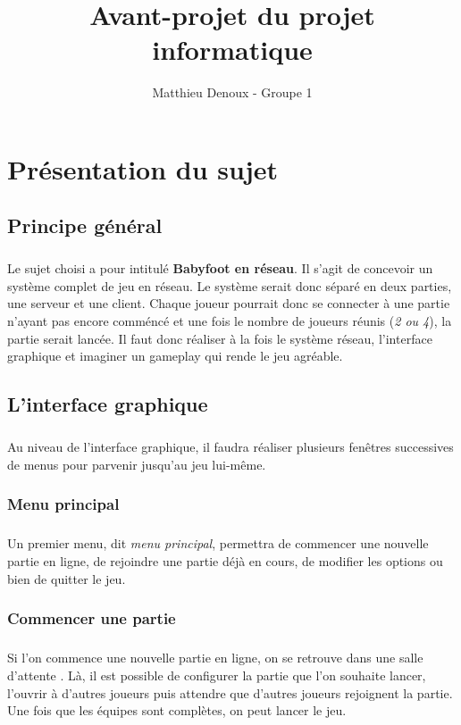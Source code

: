 \documentclass[a4paper,12pt]{report}
\title{Avant-projet du projet informatique}
\author{Matthieu Denoux - Groupe 1}
\begin{document}
\maketitle
\tableofcontents
\chapter{Présentation du sujet}
\section{Principe général}
\paragraph{}
Le sujet choisi a pour intitulé \textbf{Babyfoot en réseau}. Il s'agit de concevoir un système complet de jeu en réseau.
Le système serait donc séparé en deux parties, une serveur et une client. Chaque joueur pourrait donc se connecter à une partie
n'ayant pas encore comméncé et une fois le nombre de joueurs réunis (\emph{2 ou 4}), la partie serait lancée. Il faut donc réaliser à la fois 
le système réseau, l'interface graphique et imaginer un gameplay qui rende le jeu agréable.
\section{L'interface graphique}
\paragraph{}
Au niveau de l'interface graphique, il faudra réaliser plusieurs fenêtres successives de menus pour parvenir jusqu'au jeu lui-même.
\subsection{Menu principal}
\paragraph{}
Un premier menu, dit \emph{menu principal}, permettra de commencer une nouvelle partie en ligne, de rejoindre une partie
déjà en cours, de modifier les options ou bien de quitter le jeu.
\subsection{Commencer une partie}
\paragraph{}
Si l'on commence une nouvelle partie en ligne, on se retrouve dans une \og salle d'attente \fg. Là, il est possible de configurer la partie que l'on souhaite lancer, l'ouvrir à d'autres joueurs puis attendre que d'autres joueurs rejoignent la partie. Une fois que les équipes sont complètes, on peut lancer le jeu.
\end{document}

